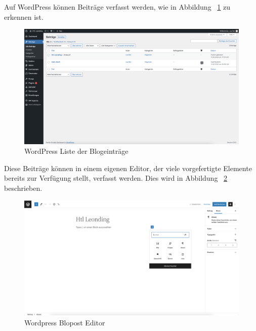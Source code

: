 Auf WordPress können Beiträge verfasst werden, wie in Abbildung ~\ref{fig:impl:bloglist} zu erkennen ist.

\begin{figure}[hbt!]
    \centering
    \includegraphics[scale=0.25]{pics/bloglist}
    \caption{WordPress Liste der Blogeinträge}
    \label{fig:impl:bloglist}
\end{figure}


Diese Beiträge können in einem eigenen Editor, der viele vorgefertigte Elemente bereits zur Verfügung stellt, verfasst werden.
Dies wird in Abbildung ~\ref{fig:impl:blogpost} beschrieben.

\begin{figure}[hbt!]
    \centering
    \includegraphics[scale=0.25]{pics/blogpost}
    \caption{Wordpress Blopost Editor}
    \label{fig:impl:blogpost}
\end{figure}
